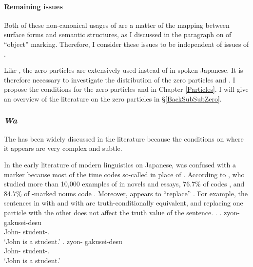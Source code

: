 \paragraph{Remaining issues}

Both of these non-canonical usages of  are a matter of the mapping
between surface forms and semantic structures,
as I discussed in the paragraph on  of ``object'' marking.
Therefore, I consider these issues to be independent of
issues of .

Like ,
the zero particles are extensively used instead of  in spoken Japanese.
It is therefore necessary to investigate the distribution of the zero particles and .
I propose the conditions for the zero particles and  in Chapter \ref{Particles}.
I will give an overview of the literature on the zero particles in \S \ref{BackSubSubZero}.




\subsubsection{\textit{Wa}}\label{Back:GeneralChar:Wa}



The   has been widely discussed in the literature
because the conditions on where it appears are very complex and subtle.

In the early literature of modern linguistics on Japanese,
 was confused with a  marker
because most of the time  codes so-called  in place of .
According to ,
who studied more than 10,000 examples of 
in novels and essays,
76.7\% of  codes , and
84.7\% of -marked nouns code .
Moreover,
 appears to ``replace'' .
For example,
the sentences in \Next[a] with  and \Next[b] with 
are truth-conditionally equivalent, and
replacing one particle with the other does not affect the truth value
of the sentence.
%
\ex.
 \ag. zyon- gakusei-desu \\
      John- student-. \\
      `John is a student.'
 \bg. zyon- gakusei-desu \\
      John- student-. \\
      `John is a student.'
      \hfill{\cite[38]{kuno73}}

